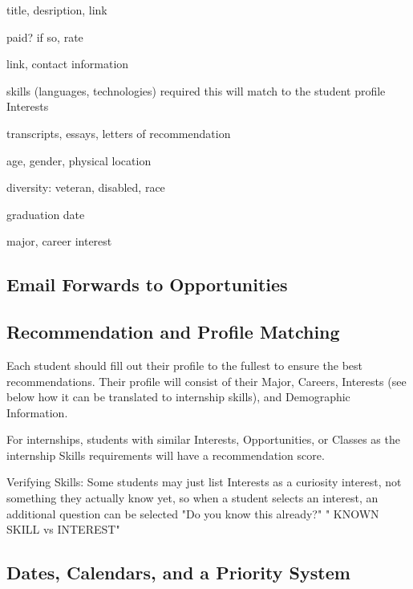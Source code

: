 \documentclass[english]{proposalnsf}
\begin{document}
		\begin{Information }
			\item title, desription, link
			\item paid? if so, rate
			\item link, contact information
		\end{Information }
		
		\begin{Application Requirements}
			\item skills (languages, technologies) required
			\subitem this will match to the student profile Interests
			\item transcripts, essays, letters of recommendation
		\end{Application Requirements}
	
			\begin{Demographic Requirements}
		\item age, gender, physical location
		\item diversity: veteran, disabled, race
		\item graduation date
		\item major, career interest
	\end{Demographic Requirements}
		
		
		\subsection{Email Forwards to Opportunities}
		
		
		\subsection{Recommendation and Profile Matching}
		Each student should fill out their profile to the fullest to ensure the best recommendations. Their profile will consist of their Major, Careers, Interests (see below how it can be translated to internship skills), and Demographic Information. 
		
		For internships, students with similar Interests, Opportunities, or Classes as the internship Skills requirements will have a recommendation score.
		
		Verifying Skills:
		Some students may just list Interests as a curiosity interest, not something they actually know yet, so when a student selects an interest, an additional question can be selected "Do you know this already?" " KNOWN SKILL vs INTEREST"
		
		
		
		\subsection{Dates, Calendars, and a Priority System}
		
	
\end{document}

